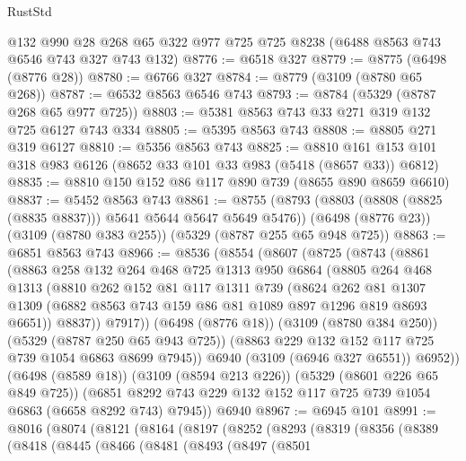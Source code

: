 \begin{lexlean}{RustStd}
\begin{coremodule}
    @132
    @990
    @28
    @268
    @65
    @322
    @977
    @725
    @725
    @8238
    (@6488 @8563 @743 @6546 @743 @327 @743 @132)
@8776 := @6518 @327
@8779 := @8775 (@6498 (@8776 @28))
@8780 := @6766 @327
@8784 := @8779 (@3109 (@8780 @65 @268))
@8787 := @6532 @8563 @6546 @743
@8793 := @8784 (@5329 (@8787 @268 @65 @977 @725))
@8803 := @5381 @8563 @743 @33 @271 @319 @132 @725 @6127 @743 @334
@8805 := @5395 @8563 @743
@8808 := @8805 @271 @319 @6127
@8810 := @5356 @8563 @743
@8825 := @8810 @161 @153 @101 @318 @983 @6126 (@8652 @33 @101 @33 @983 (@5418 (@8657 @33)) @6812)
@8835 := @8810 @150 @152 @86 @117 @890 @739 (@8655 @890 @8659 @6610)
@8837 := @5452 @8563 @743
@8861 := @8755
    (@8793 (@8803 (@8808 (@8825 (@8835 @8837))) @5641 @5644 @5647 @5649 @5476))
    (@6498 (@8776 @23))
    (@3109 (@8780 @383 @255))
    (@5329 (@8787 @255 @65 @948 @725))
@8863 := @6851 @8563 @743
@8966 := @8536
    (@8554
      (@8607
        (@8725
          (@8743
            (@8861
              (@8863
                @258
                @132
                @264
                @468
                @725
                @1313
                @950
                @6864
                (@8805
                  @264
                  @468
                  @1313
                  (@8810
                    @262
                    @152
                    @81
                    @117
                    @1311
                    @739
                    (@8624
                      @262
                      @81
                      @1307
                      @1309
                      (@6882 @8563 @743 @159 @86 @81 @1089 @897 @1296 @819 @8693 @6651))
                    @8837))
                @7917))
            (@6498 (@8776 @18))
            (@3109 (@8780 @384 @250))
            (@5329 (@8787 @250 @65 @943 @725))
            (@8863 @229 @132 @152 @117 @725 @739 @1054 @6863 @8699 @7945))
          @6940
          (@3109 (@6946 @327 @6551))
          @6952))
      (@6498 (@8589 @18))
      (@3109 (@8594 @213 @226))
      (@5329 (@8601 @226 @65 @849 @725))
      (@6851 @8292 @743 @229 @132 @152 @117 @725 @739 @1054 @6863 (@6658 @8292 @743) @7945))
    @6940
@8967 := @6945 @101
@8991 := @8016
    (@8074
      (@8121
        (@8164
          (@8197
            (@8252
              (@8293
                (@8319
                  (@8356
                    (@8389
                      (@8418
                        (@8445
                          (@8466
                            (@8481
                              (@8493
                                (@8497
                                  (@8501

\end{coremodule}
\end{lexlean}
